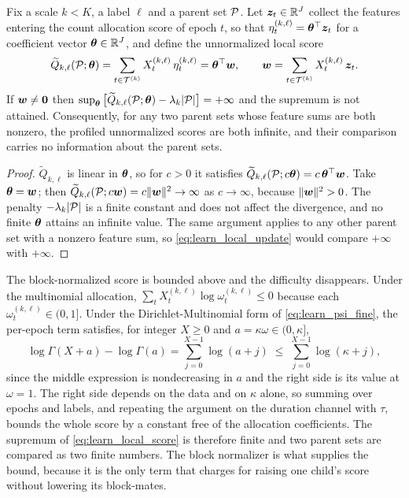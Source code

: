 \begin{proposition}
\label{prop:learn_unnormalized}
Fix a scale $k < K$, a label $\ell$ and a parent set ${\mathcal{P}}$. Let ${\bm{z}}_t \in {\mathbb{R}}^{J}$ collect the
features entering the count allocation score of epoch $t$, so that
$\eta_t^{(k,\ell)} = {\boldsymbol{\theta}}^\top {\bm{z}}_t$ for a coefficient vector ${\boldsymbol{\theta}} \in {\mathbb{R}}^{J}$, and
define the unnormalized local score
\begin{align}
\widetilde{Q}_{k,\ell}({\mathcal{P}};{\boldsymbol{\theta}})
=
\sum_{t \in {\mathcal{T}}^{(k)}} X_t^{(k,\ell)}\, \eta_t^{(k,\ell)}
=
{\boldsymbol{\theta}}^\top {\bm{w}},
\qquad
{\bm{w}} = \sum_{t \in {\mathcal{T}}^{(k)}} X_t^{(k,\ell)}\, {\bm{z}}_t .
\label{eq:learn_unnormalized_score}
\end{align}
If ${\bm{w}} \neq {\bm{0}}$ then
$\sup_{{\boldsymbol{\theta}}} \big[\widetilde{Q}_{k,\ell}({\mathcal{P}};{\boldsymbol{\theta}}) - \lambda_k |{\mathcal{P}}|\big] = +\infty$ and the
supremum is not attained. Consequently, for any two parent sets whose feature sums are both
nonzero, the profiled unnormalized scores are both infinite, and their comparison carries no
information about the parent sets.
\end{proposition}

\begin{proof}
$\widetilde{Q}_{k,\ell}$ is linear in ${\boldsymbol{\theta}}$, so for $c>0$ it satisfies
$\widetilde{Q}_{k,\ell}({\mathcal{P}}; c{\boldsymbol{\theta}}) = c\,{\boldsymbol{\theta}}^\top {\bm{w}}$. Take ${\boldsymbol{\theta}} = {\bm{w}}$; then
$\widetilde{Q}_{k,\ell}({\mathcal{P}}; c{\bm{w}}) = c\|{\bm{w}}\|^2 \to \infty$ as $c \to \infty$, because
$\|{\bm{w}}\|^2 > 0$. The penalty $-\lambda_k|{\mathcal{P}}|$ is a finite constant and does not affect the
divergence, and no finite ${\boldsymbol{\theta}}$ attains an infinite value. The same argument applies to any
other parent set with a nonzero feature sum, so \cref{eq:learn_local_update} would compare
$+\infty$ with $+\infty$.
\end{proof}

\begin{remark}
\label{rem:learn_normalizer_bounds}
The block-normalized score is bounded above and the difficulty disappears. Under the multinomial
allocation, $\sum_t X_t^{(k,\ell)} \log \omega_t^{(k,\ell)} \le 0$ because each
$\omega_t^{(k,\ell)} \in (0,1]$. Under the Dirichlet-Multinomial form of
\cref{eq:learn_psi_fine}, the per-epoch term satisfies, for integer $X \ge 0$ and
$a = \kappa\omega \in (0,\kappa]$,
\[
\log\Gamma(X+a) - \log\Gamma(a) = \sum_{j=0}^{X-1} \log(a+j) \;\le\; \sum_{j=0}^{X-1} \log(\kappa+j),
\]
since the middle expression is nondecreasing in $a$ and the right side is its value at
$\omega = 1$. The right side depends on the data and on $\kappa$ alone, so summing over epochs and
labels, and repeating the argument on the duration channel with $\tau$, bounds the whole score by
a constant free of the allocation coefficients. The supremum of
\cref{eq:learn_local_score} is therefore finite and two parent sets are compared as two finite
numbers. The block normalizer is what supplies the bound, because it is the only term that
charges for raising one child's score without lowering its block-mates.
\end{remark}

